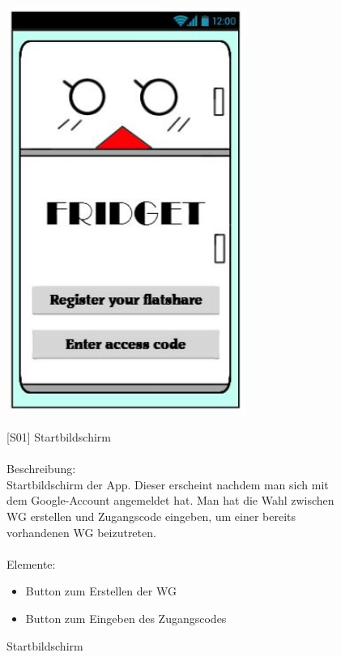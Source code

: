 \documentclass[a4paper]{scrreprt}
\begin{document}
        \begin{figure}[h]
        	\begin{minipage}[b]{0.4\linewidth}
        		
        		\flushright
        		\centering
        		\includegraphics[width=0.7\textwidth]{fridget_start.JPG}
        		\caption{Startbildschirm}
        		\label{fig:figure1}
        	\end{minipage}
        	\hspace{0.5cm}
        	\begin{minipage}[b]{0.55\linewidth}
        		\flushleft
        		{[}S01{]} Startbildschirm \\
        		\hfill
        		\\Beschreibung: \\
        		Startbildschirm der App. Dieser erscheint nachdem man sich mit dem Google-Account angemeldet hat. Man hat die Wahl zwischen WG erstellen und Zugangscode eingeben, um einer bereits vorhandenen WG beizutreten.
        		\\
        		\hfill 
        		\\Elemente:
        		\begin{itemize}
        		\renewcommand\labelitemi{--}
        		\item Button zum Erstellen der WG
        		\item Button zum Eingeben des Zugangscodes
        		\end{itemize}
        	

\end{minipage}
\end{figure}
\end{document}
